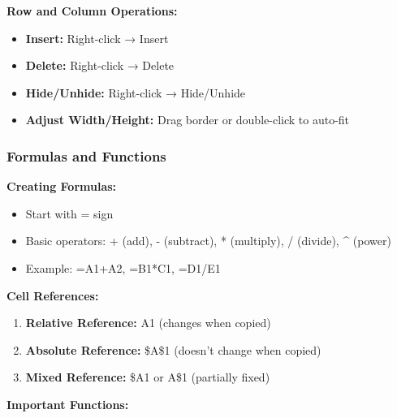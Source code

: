 \documentclass[12pt,a4paper]{article}
\begin{document}
\textbf{Row and Column Operations:}
\begin{itemize}
    \item \textbf{Insert:} Right-click → Insert
    \item \textbf{Delete:} Right-click → Delete
    \item \textbf{Hide/Unhide:} Right-click → Hide/Unhide
    \item \textbf{Adjust Width/Height:} Drag border or double-click to auto-fit
\end{itemize}

\subsubsection{Formulas and Functions}

\textbf{Creating Formulas:}
\begin{itemize}
    \item Start with = sign
    \item Basic operators: + (add), - (subtract), * (multiply), / (divide), \^{} (power)
    \item Example: =A1+A2, =B1*C1, =D1/E1
\end{itemize}

\textbf{Cell References:}
\begin{enumerate}
    \item \textbf{Relative Reference:} A1 (changes when copied)
    \item \textbf{Absolute Reference:} \$A\$1 (doesn't change when copied)
    \item \textbf{Mixed Reference:} \$A1 or A\$1 (partially fixed)
\end{enumerate}

\textbf{Important Functions:}
\end{document}
